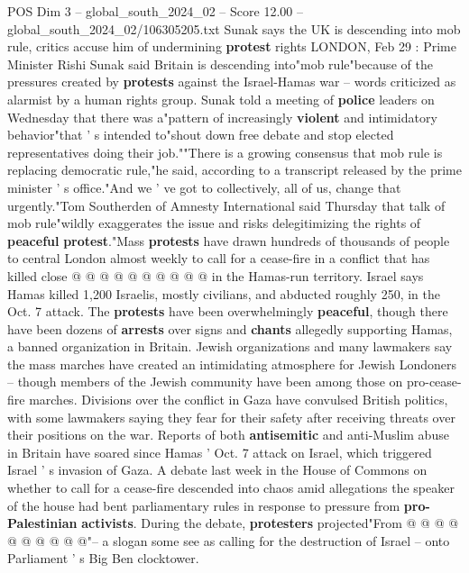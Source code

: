 \begin{textsample}{POS Dim 3 – global\_south\_2024\_02 – Score 12.00 – global\_south\_2024\_02/106305205.txt}  \label{ex:f3_pos_368}
Sunak says the UK is descending into mob rule, critics accuse him of undermining \textbf{protest} rights LONDON, Feb 29 : Prime Minister Rishi Sunak said Britain is descending into"mob rule"because of the pressures created by \textbf{protests} against the Israel-Hamas war -- words criticized as alarmist by a human rights group.
Sunak told a meeting of \textbf{police} leaders on Wednesday that there was a"pattern of increasingly \textbf{violent} and intimidatory behavior"that ' s intended to"shout down free debate and stop elected representatives doing their job.""There is a growing consensus that mob rule is replacing democratic rule,"he said, according to a transcript released by the prime minister ' s office."And we ' ve got to collectively, all of us, change that urgently."Tom Southerden of Amnesty International said Thursday that talk of mob rule"wildly exaggerates the issue and risks delegitimizing the rights of \textbf{peaceful} \textbf{protest}."Mass \textbf{protests} have drawn hundreds of thousands of people to central London almost weekly to call for a cease-fire in a conflict that has killed close @ @ @ @ @ @ @ @ @ @ in the Hamas-run territory.
Israel says Hamas killed 1,200 Israelis, mostly civilians, and abducted roughly 250, in the Oct. 7 attack.
The \textbf{protests} have been overwhelmingly \textbf{peaceful}, though there have been dozens of \textbf{arrests} over signs and \textbf{chants} allegedly supporting Hamas, a banned organization in Britain.
Jewish organizations and many lawmakers say the mass marches have created an intimidating atmosphere for Jewish Londoners -- though members of the Jewish community have been among those on pro-cease-fire marches.
Divisions over the conflict in Gaza have convulsed British politics, with some lawmakers saying they fear for their safety after receiving threats over their positions on the war.
Reports of both \textbf{antisemitic} and anti-Muslim abuse in Britain have soared since Hamas ' Oct. 7 attack on Israel, which triggered Israel ' s invasion of Gaza.
A debate last week in the House of Commons on whether to call for a cease-fire descended into chaos amid allegations the speaker of the house had bent parliamentary rules in response to pressure from \textbf{pro-Palestinian} \textbf{activists}.
During the debate, \textbf{protesters} projected"From @ @ @ @ @ @ @ @ @ @"-- a slogan some see as calling for the destruction of Israel -- onto Parliament ' s Big Ben clocktower.

\end{textsample}
